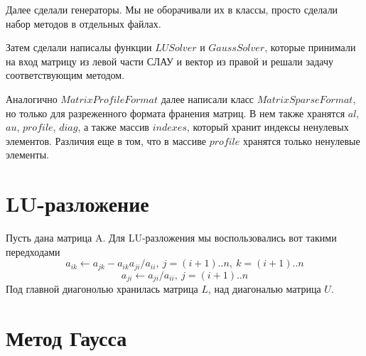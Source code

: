 Далее сделали генераторы. Мы не оборачивали их в классы, просто сделали набор методов в отдельных файлах.

Затем сделали написалы функции $LUSolver$ и $GaussSolver$, которые принимали на вход 
матрицу из левой части СЛАУ и вектор из правой и решали задачу соответствующим методом.

Аналогично $MatrixProfileFormat$ далее написали класс $MatrixSparseFormat$, но только для разреженного формата
франения матриц. В нем также хранятся $al$, $au$, $profile$, $diag$, а также массив $indexes$, 
который хранит индексы ненулевых элементов. Различия еще в том, что 
в массиве $profile$ хранятся только ненулевые элементы.


\section{LU-разложение}

Пусть дана матрица A. Для LU-разложения мы воспользовались вот такими передходами
$$a_{ik} \leftarrow a_{jk} - a_{ik}a_{ji}/a_{ii}, \ j = (i + 1)..n, \ k = (i + 1)..n$$
$$a_{ji} \leftarrow a_{ji}/a_{ii}, \ j = (i + 1)..n$$
Под главной диагонолью хранилась матрица $L$, над диагональю матрица $U$.





\section{Метод Гаусса}